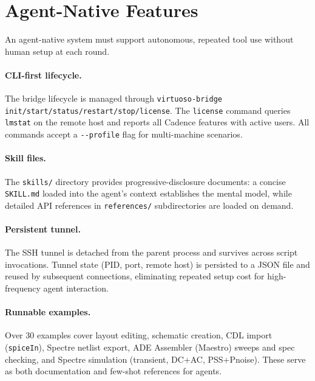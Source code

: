 \documentclass[lettersize,journal]{ieee_template/IEEEtran}
\begin{document}
\section{Agent-Native Features}

An agent-native system must support autonomous, repeated tool use without human setup at each round.

\paragraph{CLI-first lifecycle.} The bridge lifecycle is managed through \texttt{virtuoso-bridge init/start/status/restart/stop/license}. The \texttt{license} command queries \texttt{lmstat} on the remote host and reports all Cadence features with active users. All commands accept a \texttt{-{}-profile} flag for multi-machine scenarios.

\paragraph{Skill files.} The \texttt{skills/} directory provides progressive-disclosure documents: a concise \texttt{SKILL.md} loaded into the agent's context establishes the mental model, while detailed API references in \texttt{references/} subdirectories are loaded on demand.

\paragraph{Persistent tunnel.} The SSH tunnel is detached from the parent process and survives across script invocations. Tunnel state (PID, port, remote host) is persisted to a JSON file and reused by subsequent connections, eliminating repeated setup cost for high-frequency agent interaction.

\paragraph{Runnable examples.} Over 30 examples cover layout editing, schematic creation, CDL import (\texttt{spiceIn}), Spectre netlist export, ADE Assembler (Maestro) sweeps and spec checking, and Spectre simulation (transient, DC+AC, PSS+Pnoise). These serve as both documentation and few-shot references for agents.

\end{document}
